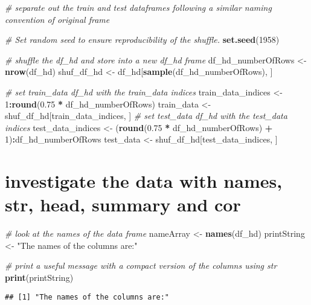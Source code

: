 \documentclass[]{article}
\newenvironment{Shaded}{\begin{snugshade}}{\end{snugshade}}
\newcommand{\KeywordTok}[1]{\textcolor[rgb]{0.13,0.29,0.53}{\textbf{#1}}}
\newcommand{\DecValTok}[1]{\textcolor[rgb]{0.00,0.00,0.81}{#1}}
\newcommand{\FloatTok}[1]{\textcolor[rgb]{0.00,0.00,0.81}{#1}}
\newcommand{\StringTok}[1]{\textcolor[rgb]{0.31,0.60,0.02}{#1}}
\newcommand{\CommentTok}[1]{\textcolor[rgb]{0.56,0.35,0.01}{\textit{#1}}}
\newcommand{\OperatorTok}[1]{\textcolor[rgb]{0.81,0.36,0.00}{\textbf{#1}}}
\newcommand{\NormalTok}[1]{#1}
\begin{document}
\begin{Shaded}
\begin{Highlighting}[]
\CommentTok{# separate out the train and test dataframes following a similar naming convention of original frame}

\CommentTok{# Set random seed to ensure reproducibility of the shuffle.}
\KeywordTok{set.seed}\NormalTok{(}\DecValTok{1958}\NormalTok{)}


\CommentTok{# shuffle the df_hd and store into a new df_hd frame}
\NormalTok{df_hd_numberOfRows <-}\StringTok{ }\KeywordTok{nrow}\NormalTok{(df_hd)}
\NormalTok{shuf_df_hd <-}\StringTok{ }\NormalTok{df_hd[}\KeywordTok{sample}\NormalTok{(df_hd_numberOfRows), ]}

\CommentTok{# set train_data df_hd with the train_data indices}
\NormalTok{train_data_indices <-}\StringTok{ }\DecValTok{1}\OperatorTok{:}\KeywordTok{round}\NormalTok{(}\FloatTok{0.75} \OperatorTok{*}\StringTok{ }\NormalTok{df_hd_numberOfRows)}
\NormalTok{train_data <-}\StringTok{ }\NormalTok{shuf_df_hd[train_data_indices, ]}
\CommentTok{# set test_data df_hd with the test_data indices}
\NormalTok{test_data_indices <-}\StringTok{ }\NormalTok{(}\KeywordTok{round}\NormalTok{(}\FloatTok{0.75} \OperatorTok{*}\StringTok{ }\NormalTok{df_hd_numberOfRows) }\OperatorTok{+}\StringTok{ }\DecValTok{1}\NormalTok{)}\OperatorTok{:}\NormalTok{df_hd_numberOfRows}
\NormalTok{test_data <-}\StringTok{ }\NormalTok{shuf_df_hd[test_data_indices, ]}
\end{Highlighting}
\end{Shaded}

\section{investigate the data with names, str, head, summary and
cor}\label{investigate-the-data-with-names-str-head-summary-and-cor}

\begin{Shaded}
\begin{Highlighting}[]
\CommentTok{# look at the names of the data frame}
\NormalTok{nameArray <-}\StringTok{ }\KeywordTok{names}\NormalTok{(df_hd)}
\NormalTok{printString <-}\StringTok{ "The names of the columns are:"}

\CommentTok{# print a useful message with a compact version of the columns using str}
\KeywordTok{print}\NormalTok{(printString)}
\end{Highlighting}
\end{Shaded}

\begin{verbatim}
## [1] "The names of the columns are:"
\end{verbatim}
\end{document}
